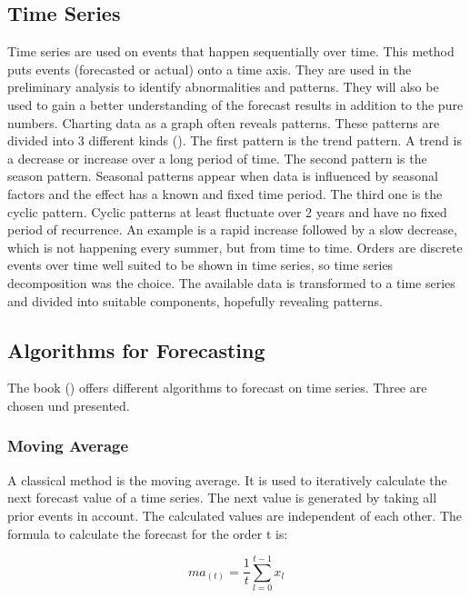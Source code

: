 \subsection{Time Series}\label{subsection:Time Series}
Time series are used on events that happen sequentially over time. This method puts events (forecasted or actual) onto a time axis.
They are used in the preliminary analysis to identify abnormalities and patterns. They will also be used to gain a better understanding of the forecast results in addition to the pure numbers. Charting data as a graph often reveals patterns. These patterns are divided into 3 different kinds (\cite{Hyndman.2013}). The first pattern is the trend pattern. A trend is a decrease or increase over a long period of time. The second pattern is the season pattern. Seasonal patterns appear when data is influenced by seasonal factors and the effect has a known and fixed time period. The third one is the cyclic pattern. Cyclic patterns at least fluctuate over 2 years and have no fixed period of recurrence. An example is a rapid increase followed by a slow decrease, which is not happening every summer, but from time to time.\newline
Orders are discrete events over time well suited to be shown in time series, so time series decomposition was the choice. The available data is transformed to a time series and divided into suitable components, hopefully revealing patterns.
\subsection{Algorithms for Forecasting}\label{subsection:Algorithms for Forecasting}
The book (\cite{Hyndman.2013}) offers different algorithms to forecast on time series. Three are chosen und presented.
\subsubsection{Moving Average}\label{subsubsection:Moving Average}
A classical method is the moving average. It is used to iteratively calculate the next forecast value of a time series. The next value is generated by taking all prior events in account. The calculated values are independent of each other.\newline
The formula to calculate the forecast for the order t is:
\begin{center}
\begin{equation}
ma_{(t)}= \frac{1}{t}\sum^{t-1}_{l = 0} x_{l}
\end{equation}
\end{center}

